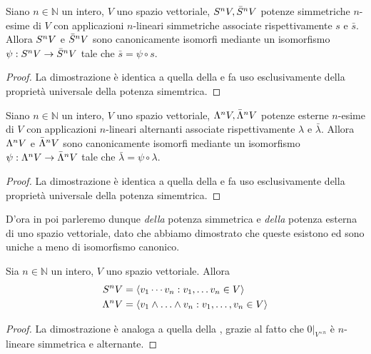 \begin{proposition}
Siano $n\in\mathbb{N}$ un intero, $V$ uno spazio vettoriale, $S^nV,\allowbreak\bar{S}^nV$ potenze simmetriche $n$-esime di $V$ con applicazioni $n$-lineari simmetriche associate rispettivamente $s$ e $\bar{s}$.
Allora $S^nV$ e $\bar{S}^nV$ sono canonicamente isomorfi mediante un isomorfismo $\psi:S^nV\to\bar{S}^nV$ tale che $\bar{s}=\psi\circ s$.
\end{proposition}
\begin{proof}
La dimostrazione è identica a quella della  e fa uso esclusivamente della proprietà universale della potenza simemtrica.
\end{proof}

\begin{proposition}
Siano $n\in\mathbb{N}$ un intero, $V$ uno spazio vettoriale, $\Lambda^nV,\allowbreak\bar{\Lambda}^nV$ potenze esterne $n$-esime di $V$ con applicazioni $n$-lineari alternanti associate rispettivamente $\lambda$ e $\bar{\lambda}$.
Allora $\Lambda^nV$ e $\bar{\Lambda}^nV$ sono canonicamente isomorfi mediante un isomorfismo $\psi:\Lambda^nV\to\bar{\Lambda}^nV$ tale che $\bar{\lambda}=\psi\circ \lambda$.
\end{proposition}
\begin{proof}
La dimostrazione è identica a quella della  e fa uso esclusivamente della proprietà universale della potenza simemtrica.
\end{proof}

D'ora in poi parleremo dunque \emph{della} potenza simmetrica e \emph{della} potenza esterna di uno spazio vettoriale, dato che abbiamo dimostrato che queste esistono ed sono uniche a meno di isomorfismo canonico.

\begin{proposition}
Sia $n\in\mathbb{N}$ un intero, $V$ uno spazio vettoriale. Allora
\begin{align*}
S^nV&=\langle v_1\cdots v_n:v_1,\ldots v_n\in V\rangle\\
\Lambda^nV&=\langle v_1\wedge\ldots\wedge v_n:v_1,\ldots, v_n\in V\rangle
\end{align*}
\end{proposition}
\begin{proof}
La dimostrazione è analoga a quella della , grazie al fatto che $0|_{V^{\times n}}$ è $n$-lineare simmetrica e alternante.
\end{proof}

